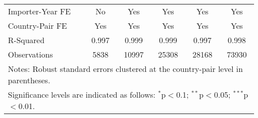\begin{table}[htbp]
\begin{adjustbox}{max width=\textwidth}
\begin{tabular}{lccccc}
    Importer-Year FE & No & Yes & Yes & Yes & Yes \\
    Country-Pair FE & Yes & Yes & Yes & Yes & Yes \\
    R-Squared & 0.997 & 0.999 & 0.999 & 0.997 & 0.998 \\
    Observations & 5838 & 10997 & 25308 & 28168 & 73930 \\
    \hline
    \multicolumn{6}{l}{\footnotesize{Notes: Robust standard errors clustered at the country-pair level in parentheses.}} \\
    \multicolumn{6}{l}{\footnotesize{Significance levels are indicated as follows: $^{\ast}$p$<$0.1; $^{\ast\ast}$p$<$0.05; $^{\ast\ast\ast}$p$<$0.01.}} \\
    \end{tabular}
    \end{adjustbox}
\end{table}
